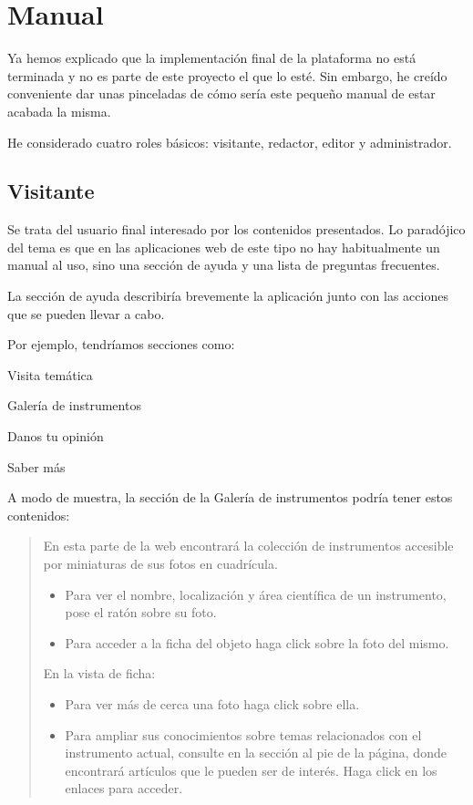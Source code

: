 \section{Manual}
\par Ya hemos explicado que la implementación final de la plataforma no está terminada y no es parte de este proyecto el que lo esté. Sin embargo, he creído conveniente dar unas pinceladas de cómo sería este pequeño manual de estar acabada la misma.
\par He considerado cuatro roles básicos: visitante, redactor, editor y administrador.

\subsection{Visitante}
\par Se trata del usuario final interesado por los contenidos presentados. Lo paradójico del tema es que en las aplicaciones web de este tipo no hay habitualmente un manual al uso, sino una sección de ayuda y una lista de preguntas frecuentes.

\par La sección de ayuda describiría brevemente la aplicación junto con las acciones que se pueden llevar a cabo.
\par Por ejemplo, tendríamos secciones como:
\begin{center}
 \begin{description}
  \item Visita temática
  \item Galería de instrumentos
  \item Danos tu opinión
  \item Saber más
  \end{description}
\end{center}

\par A modo de muestra, la sección de la Galería de instrumentos podría tener estos contenidos:
\begin{quotation}
 En esta parte de la web encontrará la colección de instrumentos accesible por miniaturas de sus fotos en cuadrícula.
\begin{itemize}
 \item Para ver el nombre, localización y área científica de un instrumento, pose el ratón sobre su foto.
\item Para acceder a la ficha del objeto haga click sobre la foto del mismo.
\end{itemize}

\par En la vista de ficha:
\begin{itemize}
 \item Para ver más de cerca una foto haga click sobre ella.
  \item Para ampliar sus conocimientos sobre temas relacionados con el instrumento actual, consulte en la sección al pie de la página, donde encontrará artículos que le pueden ser de interés. Haga click en los enlaces para acceder.
\end{itemize}
\end{quotation}

